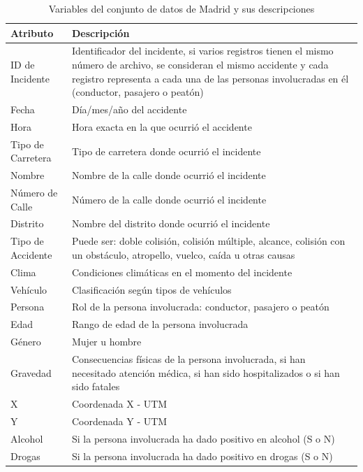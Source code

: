 \begin{table}[ht]
	\begin{center}
		\begin{tabular}{|p{3cm}|p{11cm}|}
			\hline
			\textbf{Atributo} & \textbf{Descripción} \\ \hline \hline
			ID de Incidente  & Identificador del incidente, si varios registros tienen el mismo número de archivo, se consideran el mismo accidente y cada registro representa a cada una de las personas involucradas en él (conductor, pasajero o peatón)  \\ \hline
			Fecha  & Día/mes/año del accidente \\ \hline
			Hora  & Hora exacta en la que ocurrió el accidente \\ \hline
			Tipo de Carretera & Tipo de carretera donde ocurrió el incidente \\ \hline
			Nombre & Nombre de la calle donde ocurrió el incidente \\ \hline
			Número de Calle & Número de la calle donde ocurrió el incidente  \\ \hline
			Distrito & Nombre del distrito donde ocurrió el incidente \\ \hline
			Tipo de Accidente  & Puede ser: doble colisión, colisión múltiple, alcance, colisión con un obstáculo, atropello, vuelco, caída u otras causas \\ \hline
			Clima  & Condiciones climáticas en el momento del incidente \\ \hline
			Vehículo  & Clasificación según tipos de vehículos \\ \hline
			Persona  & Rol de la persona involucrada: conductor, pasajero o peatón \\ \hline
			Edad  & Rango de edad de la persona involucrada \\ \hline
			Género  & Mujer u hombre \\ \hline
			Gravedad & Consecuencias físicas de la persona involucrada, si han necesitado atención médica, si han sido hospitalizados o si han sido fatales \\ \hline
			X   & Coordenada X - UTM \\ \hline
			Y   & Coordenada Y - UTM \\ \hline
			Alcohol & Si la persona involucrada ha dado positivo en alcohol (S o N) \\ \hline
			Drogas & Si la persona involucrada ha dado positivo en drogas (S o N) \\ \hline \hline
		\end{tabular}
	\end{center}
	\caption{Variables del conjunto de datos de Madrid y sus descripciones}
	\label{Datadescription}
\end{table}

